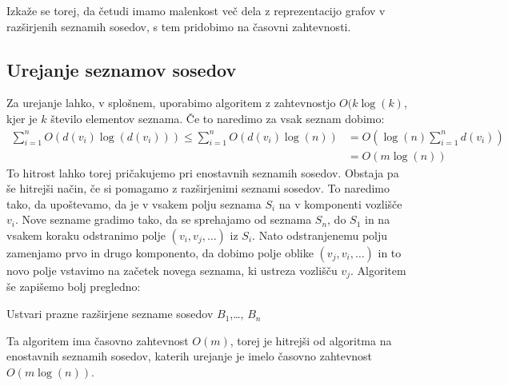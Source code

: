 \documentclass[a4paper, 10pt]{article}
\begin{document}
	Izkaže se torej, da četudi imamo malenkost več dela z reprezentacijo grafov v razširjenih seznamih sosedov, s tem pridobimo na časovni zahtevnosti.
	
	\subsection{Urejanje seznamov sosedov}
	Za urejanje lahko, v splošnem, uporabimo algoritem z zahtevnostjo $O(k\log(k)$, kjer je $k$ število elementov seznama. Če to naredimo za vsak seznam dobimo: \begin{align*}
		\sum_{i=1}^{n} O(d(v_i)\log(d(v_i))) \leq \sum_{i=1}^{n} O(d(v_i)\log(n)) &= O(\log(n)\sum_{i=1}^{n}d(v_i)) \\
		&= O(m\log(n)) 
	\end{align*}
	To hitrost lahko torej pričakujemo pri enostavnih seznamih sosedov. Obstaja pa še hitrejši način, če si pomagamo z razširjenimi seznami sosedov. To naredimo tako, da upoštevamo, da je v vsakem polju seznama $S_i$ na v komponenti vozlišče $v_i$.
	Nove sezname gradimo tako, da se sprehajamo od seznama $S_n$, do $S_1$ in na vsakem koraku odstranimo polje $(v_i, v_j, \ldots)$ iz $S_i$. Nato odstranjenemu polju zamenjamo prvo in drugo komponento, da dobimo polje oblike $(v_j, v_i, \ldots)$ in to novo polje vstavimo na začetek novega seznama, ki ustreza vozlišču $v_j$. Algoritem še zapišemo bolj pregledno:
	\begin{algorithm}[h!]
			Ustvari prazne razširjene sezname sosedov $B_1$,\ldots, $B_n$\;
	\end{algorithm}
		
		Ta algoritem ima časovno zahtevnost $O(m)$, torej je hitrejši od algoritma na enostavnih seznamih sosedov, katerih urejanje je imelo časovno zahtevnost $O(m\log(n))$.
	
\end{document}
